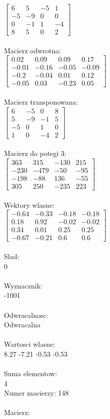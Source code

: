 \documentclass[a4paper,12pt]{article}
\begin{document}
$\begin{bmatrix} 6&5&-5&1\\-5&-9&0&0\\0&-1&1&-4\\8&5&0&2 \end{bmatrix}$
\\
\\
Macierz odwrotna:\\

$\begin{bmatrix} 0.02&0.09&0.09&0.17\\-0.01&-0.16&-0.05&-0.09\\-0.2&-0.04&0.01&0.12\\-0.05&0.03&-0.23&0.05 \end{bmatrix}$
\\
\\
Macierz transponowana:\\

$\begin{bmatrix} 6&-5&0&8\\5&-9&-1&5\\-5&0&1&0\\1&0&-4&2 \end{bmatrix}$
\\
\\
Macierz do potegi 3:\\

$\begin{bmatrix} 363&315&-130&215\\-230&-479&-50&-95\\-198&-88&136&-55\\305&250&-235&223 \end{bmatrix}$
\\
\\
Wektory wlasne:\\

$\begin{bmatrix} -0.64&-0.33&-0.18&-0.18\\0.18&0.92&-0.02&-0.02\\0.34&0.01&0.25&0.25\\-0.67&-0.21&0.6&0.6 \end{bmatrix}$
\\
\\
Slad:\\
0
\\
\\
Wyznacznik:\\
-1001
\\
\\
Odwracalnosc:\\
Odwracalna
\\
\\
Wartosci wlasne:\\
8.27 -7.21 -0.53 -0.53
\\
\\
Suma elementow:\\
4
\\
\newpage
Numer macierzy:
148
\\
\\
Macierz:\\
\end{document}
